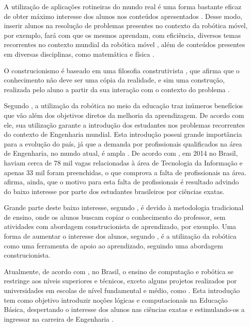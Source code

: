 	A utilização de aplicações rotineiras do mundo real é uma forma bastante eficaz de obter máximo interesse dos alunos nos conteúdos apresentados \cite{construcionismoPapert}. Desse modo, inserir alunos na resolução de problemas presentes no contexto da robótica móvel, por exemplo, fará com que os mesmos aprendam, com eficiência, diversos temas recorrentes no contexto mundial da robótica móvel \cite{simpleRobotsIntroductionEng}, além de conteúdos presentes em diversas disciplinas, como matemática e física \cite{roboticaEducacionalAulasMatematica}.

	O construcionismo é baseado em uma filosofia construtivista \cite{construcionismoPapert}, que afirma que o conhecimento não deve ser uma cópia da realidade, e sim uma construção, realizada pelo aluno a partir da sua interação com o contexto do problema \cite{oQueEConstrutivismo}.


Segundo \cite{simpleRobotsIntroductionEng}, a utilização da robótica no meio da educação traz inúmeros benefícios que vão além dos objetivos diretos da melhoria da aprendizagem. De acordo com ele, sua utilização garante a introdução dos estudantes nos problemas recorrentes do contexto de Engenharia mundial. Esta introdução possui grande importância para a evolução do país, já que a demanda por profissionais qualificados na área de Engenharia, no mundo atual, é ampla \cite{simpleRobotsIntroductionEng}. De acordo com \cite{analiseFerramentaEnsinoComputacao}, em 2014 no Brasil, haviam cerca de 78 mil vagas relacionadas à área de Tecnologia da Informação e apenas 33 mil foram preenchidas, o que comprova a falta de profissionais na área.  \cite{analiseFerramentaEnsinoComputacao} afirma, ainda, que o motivo para esta falta de profissionais é resultado advindo do baixo interesse por parte dos estudantes brasileiros por ciências exatas.

Grande parte deste baixo interesse, segundo \cite{oQueEConstrutivismo}, é devido à metodologia tradicional de ensino, onde os alunos buscam copiar o conhecimento do professor, sem atividades com abordagem construcionista de aprendizado, por exemplo. Uma forma de aumentar o interesse dos alunos, segundo \cite{roboticaEducacionalAulasMatematica}, é a utilização da robótica como uma ferramenta de apoio ao aprendizado, seguindo uma abordagem construcionista.

Atualmente, de acordo com \cite{analiseFerramentaEnsinoComputacao}, no Brasil, o ensino de computação e robótica se restringe aos níveis superiores e técnicos, exceto alguns projetos realizados por universidades em escolas de nível fundamental e médio, como \cite{projetoRoboticaMauricio}. Esta introdução tem como objetivo introduzir noções lógicas e computacionais na Educação Básica, despertando o interesse dos alunos nas ciências exatas e estimulando-os a ingressar na carreira de Engenharia \cite{analiseFerramentaEnsinoComputacao}.

